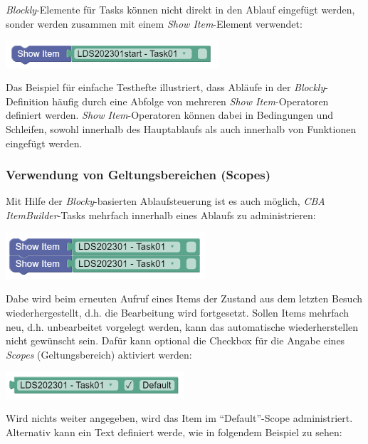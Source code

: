 \documentclass[
  letterpaper,
  DIV=11]{scrreprt}
\begin{document}
\begin{tcolorbox}
\emph{Blockly}-Elemente für Tasks können nicht direkt in den Ablauf
eingefügt werden, sonder werden zusammen mit einem \emph{Show
Item}-Element verwendet:

\includegraphics[width=3.125in,height=\textheight]{img/screenshot-show-item-block-lds2023-01-example-01-ENG.png}

Das Beispiel für einfache Testhefte illustriert, dass Abläufe in der
\emph{Blockly}-Definition häufig durch eine Abfolge von mehreren
\emph{Show Item}-Operatoren definiert werden. \emph{Show
Item}-Operatoren können dabei in Bedingungen und Schleifen, sowohl
innerhalb des Hauptablaufs als auch innerhalb von Funktionen eingefügt
werden.

\hypertarget{verwendung-von-geltungsbereichen-scopes-1}{%
\subsubsection{Verwendung von Geltungsbereichen
(Scopes)}\label{verwendung-von-geltungsbereichen-scopes-1}}

Mit Hilfe der \emph{Blocky}-basierten Ablaufsteuerung ist es auch
möglich, \emph{CBA ItemBuilder}-Tasks mehrfach innerhalb eines Ablaufs
zu administrieren:

\includegraphics[width=2.91667in,height=\textheight]{img/screenshot-item-element-two-times-without-scope-lds2003-01-example-ENG.png}

Dabe wird beim erneuten Aufruf eines Items der Zustand aus dem letzten
Besuch wiederhergestellt, d.h. die Bearbeitung wird fortgesetzt. Sollen
Items mehrfach neu, d.h. unbearbeitet vorgelegt werden, kann das
automatische wiederherstellen nicht gewünscht sein. Dafür kann optional
die Checkbox für die Angabe eines \emph{Scopes} (Geltungsbereich)
aktiviert werden:

\includegraphics[width=2.60417in,height=\textheight]{img/screenshot-item-element-scope-lds2003-01-default.png}

Wird nichts weiter angegeben, wird das Item im ``Default''-Scope
administriert. Alternativ kann ein Text definiert werde, wie in
folgendem Beispiel zu sehen:


\end{tcolorbox}
\end{document}
